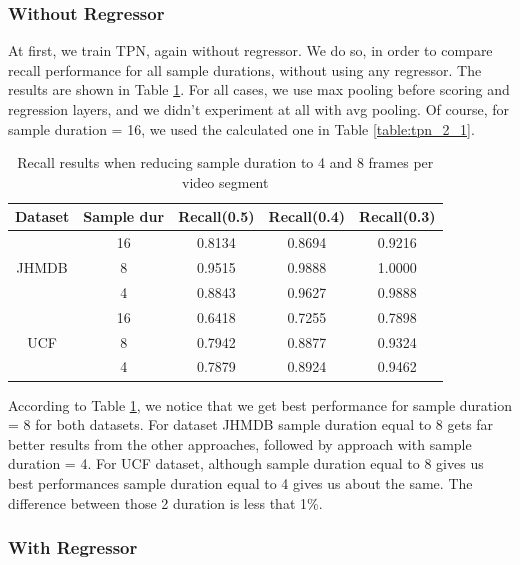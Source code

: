 \subsubsection{Without Regressor}

At first, we train TPN, again without regressor. We do so, in order to compare recall performance for all sample durations, without using any regressor. The results
are shown in Table \ref{table:new_sample}. For all cases, we use max pooling before scoring and regression layers, and we didn't experiment at all with
avg pooling. Of course, for sample duration = 16, we used the calculated one in  Table \ref{table:tpn_2_1}.

\begin{table}[h]
  \centering
  \begin{tabular}{|c | c || c c c|}
    \hline
    \textbf{Dataset} & \textbf{Sample dur} & \textbf{Recall(0.5)} &  \textbf{Recall(0.4)} &  \textbf{Recall(0.3)} \\
    \hline
    \multirow{3}{*}{JHMDB} & 16 & 0.8134 & 0.8694 & 0.9216 \\
    \cline{2-5}
    {} & 8 & 0.9515 & 0.9888 & 1.0000 \\
    \cline{2-5}
    {} & 4 & 0.8843 & 0.9627 & 0.9888 \\
    \hline
    \multirow{3}{*}{UCF} & 16 & 0.6418 & 0.7255 & 0.7898 \\
    \cline{2-5}
    {} & 8 & 0.7942 & 0.8877 & 0.9324\\
    \cline{2-5}
    {} & 4 & 0.7879 & 0.8924 & 0.9462 \\
    \hline
    
  \end{tabular}
  \caption{Recall results when reducing sample duration to 4 and 8 frames per video segment}
  \label{table:new_sample}
\end{table}

According to Table \ref{table:new_sample}, we notice that we get best performance for sample duration = 8 for both datasets. For dataset JHMDB sample duration equal to 8
gets far better results from the other approaches, followed by approach with sample duration = 4. For UCF dataset, although sample duration equal to 8 gives us best performances
sample duration equal to 4 gives us about the same. The difference between those 2 duration is less that 1\%. 

\subsubsection{With Regressor}                                             

